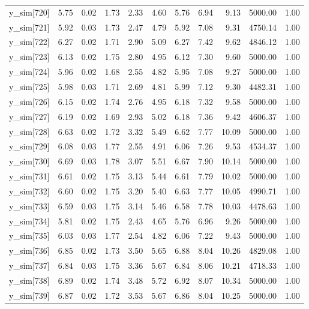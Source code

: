 \begin{table}[ht]
\begin{tabular}{rrrrrrrrrrr}
  y\_sim[720] & 5.75 & 0.02 & 1.73 & 2.33 & 4.60 & 5.76 & 6.94 & 9.13 & 5000.00 & 1.00 \\ 
  y\_sim[721] & 5.92 & 0.03 & 1.73 & 2.47 & 4.79 & 5.92 & 7.08 & 9.31 & 4750.14 & 1.00 \\ 
  y\_sim[722] & 6.27 & 0.02 & 1.71 & 2.90 & 5.09 & 6.27 & 7.42 & 9.62 & 4846.12 & 1.00 \\ 
  y\_sim[723] & 6.13 & 0.02 & 1.75 & 2.80 & 4.95 & 6.12 & 7.30 & 9.60 & 5000.00 & 1.00 \\ 
  y\_sim[724] & 5.96 & 0.02 & 1.68 & 2.55 & 4.82 & 5.95 & 7.08 & 9.27 & 5000.00 & 1.00 \\ 
  y\_sim[725] & 5.98 & 0.03 & 1.71 & 2.69 & 4.81 & 5.99 & 7.12 & 9.30 & 4482.31 & 1.00 \\ 
  y\_sim[726] & 6.15 & 0.02 & 1.74 & 2.76 & 4.95 & 6.18 & 7.32 & 9.58 & 5000.00 & 1.00 \\ 
  y\_sim[727] & 6.19 & 0.02 & 1.69 & 2.93 & 5.02 & 6.18 & 7.36 & 9.42 & 4606.37 & 1.00 \\ 
  y\_sim[728] & 6.63 & 0.02 & 1.72 & 3.32 & 5.49 & 6.62 & 7.77 & 10.09 & 5000.00 & 1.00 \\ 
  y\_sim[729] & 6.08 & 0.03 & 1.77 & 2.55 & 4.91 & 6.06 & 7.26 & 9.53 & 4534.37 & 1.00 \\ 
  y\_sim[730] & 6.69 & 0.03 & 1.78 & 3.07 & 5.51 & 6.67 & 7.90 & 10.14 & 5000.00 & 1.00 \\ 
  y\_sim[731] & 6.61 & 0.02 & 1.75 & 3.13 & 5.44 & 6.61 & 7.79 & 10.02 & 5000.00 & 1.00 \\ 
  y\_sim[732] & 6.60 & 0.02 & 1.75 & 3.20 & 5.40 & 6.63 & 7.77 & 10.05 & 4990.71 & 1.00 \\ 
  y\_sim[733] & 6.59 & 0.03 & 1.75 & 3.14 & 5.46 & 6.58 & 7.78 & 10.03 & 4478.63 & 1.00 \\ 
  y\_sim[734] & 5.81 & 0.02 & 1.75 & 2.43 & 4.65 & 5.76 & 6.96 & 9.26 & 5000.00 & 1.00 \\ 
  y\_sim[735] & 6.03 & 0.03 & 1.77 & 2.54 & 4.82 & 6.06 & 7.22 & 9.43 & 5000.00 & 1.00 \\ 
  y\_sim[736] & 6.85 & 0.02 & 1.73 & 3.50 & 5.65 & 6.88 & 8.04 & 10.26 & 4829.08 & 1.00 \\ 
  y\_sim[737] & 6.84 & 0.03 & 1.75 & 3.36 & 5.67 & 6.84 & 8.06 & 10.21 & 4718.33 & 1.00 \\ 
  y\_sim[738] & 6.89 & 0.02 & 1.74 & 3.48 & 5.72 & 6.92 & 8.07 & 10.34 & 5000.00 & 1.00 \\ 
  y\_sim[739] & 6.87 & 0.02 & 1.72 & 3.53 & 5.67 & 6.86 & 8.04 & 10.25 & 5000.00 & 1.00 \\ 

\end{tabular}
\end{table}
